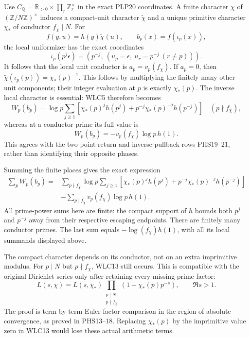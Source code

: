 Use $C_{\mathbb Q}=\mathbb R_{>0}\times\prod_r\mathbb Z_r^\times$
in the exact PLP20 coordinates. A finite character $\chi$ of
$(\mathbb Z/N\mathbb Z)^\times$ induces a compact-unit character
$\widetilde\chi$ and a unique primitive character $\chi_*$
of conductor $f_\chi\mid N$. For
\begin{equation}\tag{WLC11}
 f(y,u)=h(y)\widetilde\chi(u),\qquad
 b_p(x)=f(\iota_p(x)),
\end{equation}
the local uniformizer has the exact coordinates
\begin{equation}\tag{WLC12}
 \iota_p(p^j\epsilon)=
 \left(p^{-j},\ (u_p=\epsilon,\ u_r=p^{-j}\ (r\ne p))\right).
\end{equation}
It follows that the local unit conductor is
$a_p=v_p(f_\chi)$. If $a_p=0$, then
$\widetilde\chi(\iota_p(p))=\chi_*(p)^{-1}$.
This follows by multiplying the finitely many other unit components;
their integer evaluation at $p$ is exactly $\chi_*(p)$.
The inverse local character is essential: WLC5 therefore becomes
\begin{equation}\tag{WLC13}
 W_p(b_p)=\log p\sum_{j\ge1}
 \left[\chi_*(p)^jh(p^j)+p^{-j}\chi_*(p)^{-j}h(p^{-j})\right]
 \quad(p\nmid f_\chi),
\end{equation}
whereas at a conductor prime its full value is
\begin{equation}\tag{WLC14}
 W_p(b_p)=-v_p(f_\chi)\log p\,h(1).
\end{equation}
This agrees with the two point-return and inverse-pullback rows
PHS19--21, rather than identifying their opposite phases.

Summing the finite places gives the exact expression
\begin{equation}\tag{WLC15}
\begin{split}
 \sum_pW_p(b_p)={}&
 \sum_{p\nmid f_\chi}\log p\sum_{j\ge1}
 \left[\chi_*(p)^jh(p^j)+p^{-j}\chi_*(p)^{-j}h(p^{-j})\right]\\
 &-\sum_{p\mid f_\chi}v_p(f_\chi)\log p\,h(1).
\end{split}
\end{equation}
All prime-power sums here are finite: the compact support of $h$
bounds both $p^j$ and $p^{-j}$ away from their respective escaping
endpoints. There are finitely many conductor primes. The last
sum equals $-\log(f_\chi)h(1)$, with all its local summands
displayed above.

The compact character depends on its conductor, not on an extra
imprimitive modulus. For $p\mid N$ but $p\nmid f_\chi$, WLC13
still occurs. This is compatible with the original Dirichlet series
only after retaining every missing-prime factor:
\begin{equation}\tag{WLC16}
 L(s,\chi)=L(s,\chi_*)
 \prod_{\substack{p\mid N\\p\nmid f_\chi}}
          (1-\chi_*(p)p^{-s}),\qquad \Re s>1.
\end{equation}
The proof is term-by-term Euler-factor comparison in the region
of absolute convergence, as proved in PHS13--18. Replacing
$\chi_*(p)$ by the imprimitive value zero in WLC13 would lose
these actual arithmetic terms.

